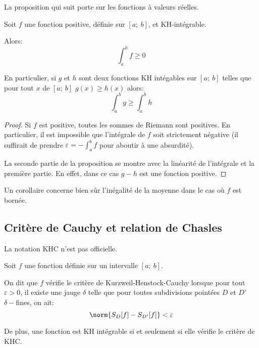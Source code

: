 La proposition qui suit porte sur les fonctions à valeurs réelles.

\begin{prop}
Soit $f$ une fonction positive, définie sur $[a;~b]$, et KH-intégrable.

Alors:
\[
\int_a^b f \geq 0
\]

En particulier, si $g$ et $h$ sont deux fonctions KH intégables sur $[a;~b]$ telles que pour tout $x$ de $[a;~b]$ $g(x) \geq h(x)$ alors:
\[
\int_a^b g \geq \int_a^b h
\]
\end{prop}


\begin{proof}
Si $f$ est positive, toutes les sommes de Riemann sont positives. En particulier, il est impossible que l'intégrale de $f$ soit strictement négative (il suffirait de prendre $\varepsilon = -\int_a^b f$ pour aboutir à une absurdité).

La seconde partie de la proposition se montre avec la linéarité de l'intégrale et la première partie. En effet, dans ce cas $g-h$ est une fonction positive.
\end{proof}

Un corollaire concerne bien sûr l'inégalité de la moyenne dans le cas où $f$ est bornée. 

\subsection{Critère de Cauchy et relation de Chasles}

La notation KHC n'est pas officielle.

\begin{theo}
Soit $f$ une fonction définie sur un intervalle $[a;~b]$.

On dit que $f$ vérifie le critère de Kurzweil-Henstock-Cauchy lorsque pour tout $\varepsilon>0$, il existe une jauge $\delta$ telle que pour toutes subdivisions pointées $D$ et $D'$ $\delta-$fines, on ait:
\[
\norm{S_D[f]-S_{D'}[f]} < \varepsilon
\]

De plus, une fonction est KH intégrable si et seulement si elle vérifie le critère de KHC.
\end{theo}

